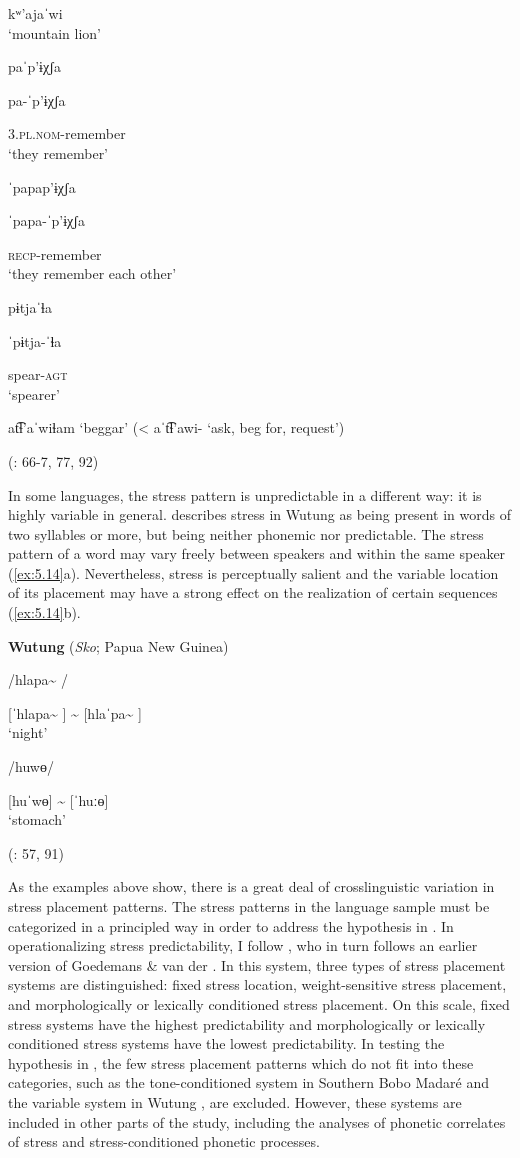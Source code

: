 \ex  kʷ’ajaˈwi\\
\glt ‘mountain lion’

\ex  paˈp’ɨχʃa

pa-ˈp’ɨχʃa

3.\textsc{pl.nom}-remember\\
\glt ‘they remember’

\ex  ˈpapap’ɨχʃa

ˈpapa-ˈp’ɨχʃa

\textsc{recp}-remember\\
\glt ‘they remember each other’

\ex  pɨtjaˈɬa

ˈpɨtja-ˈɬa

spear-\textsc{agt}\\
\glt ‘spearer’

\ex  at͡ɬ’aˈwiɬam ‘beggar’ (< aˈt͡ɬ’awi- ‘ask, beg for, request’)

(\citealt{HargusBeavert2005}: 66-7, 77, 92)
\z
\z

  In some languages, the stress pattern is unpredictable in a different way: it is highly variable in general. \citet{Marmion2010} describes stress in Wutung as being present in words of two syllables or more, but being neither phonemic nor predictable. The stress pattern of a word may vary freely between speakers and within the same speaker (\ref{ex:5.14}a). Nevertheless, stress is perceptually salient and the variable location of its placement may have a strong effect on the realization of certain sequences (\ref{ex:5.14}b).

\ea\label{ex:5.14}
  \textbf{Wutung} (\textit{Sko}; Papua New Guinea)

\ea  /hlapa\~{} /

[ˈhlapa\~{} ] {\textasciitilde} [hlaˈpa\~{} ]\\
\glt ‘night’

\ex  /huwɵ/

[huˈwɵ] {\textasciitilde} [ˈhuːɵ]\\
\glt ‘stomach’

(\citealt{Marmion2010}: 57, 91)
\z
\z

  As the examples above show, there is a great deal of crosslinguistic variation in stress placement patterns. The stress patterns in the language sample must be categorized in a principled way in order to address the hypothesis in . In operationalizing stress predictability, I follow \citet{Schiering2007}, who in turn follows an earlier version of Goedemans \& van der \citet{Hulst2013a}. In this system, three types of stress placement systems are distinguished: fixed stress location, weight-sensitive stress placement, and morphologically or lexically conditioned stress placement. On this scale, fixed stress systems have the highest predictability and morphologically or lexically conditioned stress systems have the lowest predictability. In testing the hypothesis in , the few stress placement patterns which do not fit into these categories, such as the tone-conditioned system in Southern Bobo Madaré  and the variable system in Wutung , are excluded. However, these systems are included in other parts of the study, including the analyses of phonetic correlates of stress and stress-conditioned phonetic processes.

